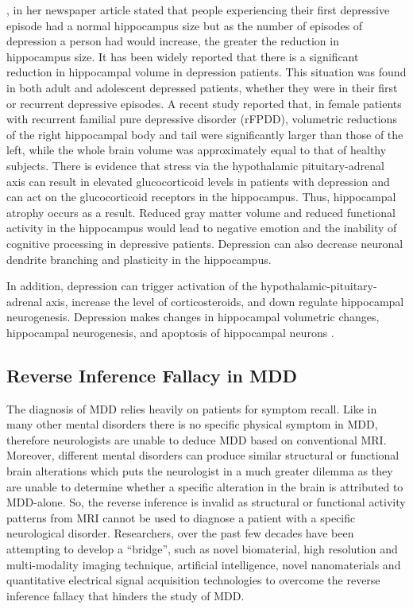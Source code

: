 ﻿\documentclass[12pt]{article}
\begin{document}
\textcite{brainshrink}, in her newspaper article stated that people
experiencing their first depressive episode had a normal hippocampus
size but as the number of episodes of depression a person had would
increase, the greater the reduction in hippocampus size. It has been
widely reported that there is a significant reduction in hippocampal
volume in depression patients. This situation was found in both adult
and adolescent depressed patients, whether they were in their first or
recurrent depressive episodes. A recent study reported that, in female
patients with recurrent familial pure depressive disorder (rFPDD),
volumetric reductions of the right hippocampal body and tail were
significantly larger than those of the left, while the whole brain
volume was approximately equal to that of healthy subjects. There is
evidence that stress via the hypothalamic pituitary-adrenal axis can
result in elevated glucocorticoid levels in patients with depression
and can act on the glucocorticoid receptors in the hippocampus. Thus,
hippocampal atrophy occurs as a result. Reduced gray matter volume and
reduced functional activity in the hippocampus would lead to negative
emotion and the inability of cognitive processing in depressive
patients. Depression can also decrease neuronal dendrite branching and
plasticity in the hippocampus.

In addition, depression can trigger activation of the
hypothalamic-pituitary-adrenal axis, increase the level of
corticosteroids, and down regulate hippocampal
neurogenesis. Depression makes changes in hippocampal volumetric
changes, hippocampal neurogenesis, and apoptosis of hippocampal
neurons \cite{effectMDD3}.

\subsection{Reverse Inference Fallacy in MDD}

\vspace{-5pt}
The diagnosis of MDD relies heavily on patients for symptom
recall. Like in many other mental disorders there is no specific
physical symptom in MDD, therefore neurologists are unable to deduce
MDD based on conventional MRI. Moreover, different mental disorders
can produce similar structural or functional brain alterations which
puts the neurologist in a much greater dilemma as they are unable to
determine whether a specific alteration in the brain is attributed to
MDD-alone. So, the reverse inference is invalid as structural or
functional activity patterns from MRI cannot be used to diagnose
a patient with a specific neurological disorder. Researchers, over the
past few decades have been attempting to develop a ``bridge'', such as
novel biomaterial, high resolution and multi-modality imaging
technique, artificial intelligence, novel nanomaterials and
quantitative electrical signal acquisition technologies to overcome
the reverse inference fallacy that hinders the study of
MDD. \cite{zhuo2019rise}
\end{document}
